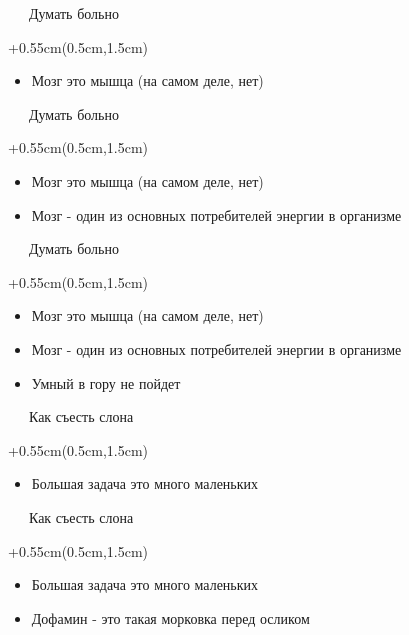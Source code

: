 \documentclass[xetex,18pt,aspectratio=169]{beamer}
\begin{document}
\begin{Large}
\begin{frame}{\ \ \ Думать больно}
\begin{textblock*}{\framewidth+0.55cm}(0.5cm,1.5cm)
\begin{itemize}
  \item Мозг это мышца (на самом деле, нет)
\end{itemize}
\end{textblock*}
\end{frame}

\begin{frame}{\ \ \ Думать больно}
\begin{textblock*}{\framewidth+0.55cm}(0.5cm,1.5cm)
\begin{itemize}
  \item Мозг это мышца (на самом деле, нет)
  \item Мозг - один из основных потребителей энергии в организме
\end{itemize}
\end{textblock*}
\end{frame}

\begin{frame}{\ \ \ Думать больно}
\begin{textblock*}{\framewidth+0.55cm}(0.5cm,1.5cm)
\begin{itemize}
  \item Мозг это мышца (на самом деле, нет)
  \item Мозг - один из основных потребителей энергии в организме
  \item Умный в гору не пойдет
\end{itemize}
\end{textblock*}
\end{frame}

\begin{frame}{\ \ \ Как съесть слона}
\begin{textblock*}{\framewidth+0.55cm}(0.5cm,1.5cm)
\begin{itemize}
  \item Большая задача это много маленьких
\end{itemize}
\end{textblock*}
\end{frame}

\begin{frame}{\ \ \ Как съесть слона}
\begin{textblock*}{\framewidth+0.55cm}(0.5cm,1.5cm)
\begin{itemize}
  \item Большая задача это много маленьких
  \item Дофамин - это такая морковка перед осликом
\end{itemize}
\end{textblock*}
\end{frame}


\end{Large}
\end{document}
